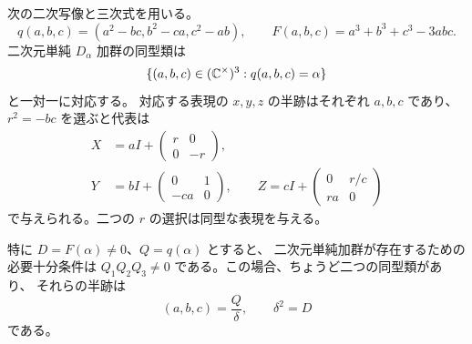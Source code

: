 \begin{proposition}[半跡による全二次元単純加群の分類]
\label{cmo:prop:two-dimensional-classification}
次の二次写像と三次式を用いる。
\[
 q(a,b,c)=(a^2-bc,b^2-ca,c^2-ab),\qquad
 F(a,b,c)=a^3+b^3+c^3-3abc.
\]
二次元単純 $D_\alpha$ 加群の同型類は
\begin{equation}\label{cmo:eq:two-dimensional-fibre}
 \{(a,b,c)\in(\mathbb C^\times)^3:q(a,b,c)=\alpha\}
\end{equation}
と一対一に対応する。
対応する表現の $x,y,z$ の半跡はそれぞれ $a,b,c$ であり、
$r^2=-bc$ を選ぶと代表は
\begin{equation}\label{cmo:eq:two-dimensional-matrices}
 \begin{split}
 X&=aI+\begin{pmatrix}r&0\\0&-r\end{pmatrix},\\
 Y&=bI+\begin{pmatrix}0&1\\-ca&0\end{pmatrix},\qquad
 Z=cI+\begin{pmatrix}0&r/c\\ra&0\end{pmatrix}
 \end{split}
\end{equation}
で与えられる。二つの $r$ の選択は同型な表現を与える。

特に $D=F(\alpha)\ne0$、$Q=q(\alpha)$ とすると、
二次元単純加群が存在するための必要十分条件は
$Q_1Q_2Q_3\ne0$ である。この場合、ちょうど二つの同型類があり、
それらの半跡は
\begin{equation}\label{cmo:eq:two-dimensional-inversion}
 (a,b,c)=\frac{Q}{\delta},\qquad \delta^2=D
\end{equation}
である。
\end{proposition}

